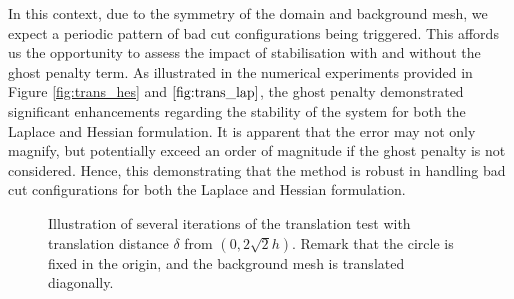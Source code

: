 In this context, due to the symmetry of the domain and background mesh, we expect a periodic pattern of bad cut configurations being triggered. This affords us the opportunity to assess the impact of stabilisation with and without the ghost penalty
term. As illustrated in the numerical experiments provided in Figure \ref{fig:trans_hes} and $\ref{fig:trans_lap} $, the ghost penalty demonstrated significant enhancements regarding the stability of the system for both the Laplace and Hessian
formulation. It is apparent that the error may not only magnify, but potentially exceed an order of magnitude if the ghost penalty is not considered. Hence, this demonstrating that the method is robust in handling bad cut configurations for both the Laplace and Hessian formulation.



\begin{figure}[h!]
    \centering
    \caption{Illustration of several iterations of the translation test with translation distance $\delta$ from  $(0,2 \sqrt{2}h)  $. Remark that the circle is fixed in the origin, and the background mesh is translated diagonally. }
    \label{fig:illustration_translation}
\end{figure}



